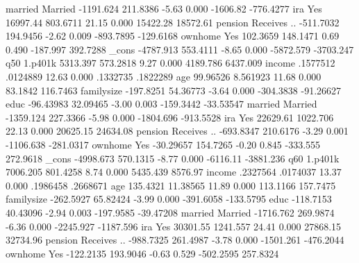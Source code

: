      married {\VBAR}
    Married  {\VBAR}  -1191.624   211.8386    -5.63   0.000     -1606.82   -776.4277
             {\VBAR}
         ira {\VBAR}
        Yes  {\VBAR}   16997.44   803.6711    21.15   0.000     15422.28    18572.61
             {\VBAR}
     pension {\VBAR}
Receives ..  {\VBAR}  -511.7032   194.9456    -2.62   0.009    -893.7895   -129.6168
             {\VBAR}
     ownhome {\VBAR}
        Yes  {\VBAR}   102.3659   148.1471     0.69   0.490     -187.997    392.7288
       _cons {\VBAR}  -4787.913   553.4111    -8.65   0.000    -5872.579   -3703.247
q50          {\VBAR}
     1.p401k {\VBAR}   5313.397   573.2818     9.27   0.000     4189.786    6437.009
      income {\VBAR}   .1577512   .0124889    12.63   0.000     .1332735    .1822289
         age {\VBAR}   99.96526   8.561923    11.68   0.000      83.1842    116.7463
  familysize {\VBAR}  -197.8251   54.36773    -3.64   0.000    -304.3838   -91.26627
        educ {\VBAR}  -96.43983   32.09465    -3.00   0.003    -159.3442   -33.53547
             {\VBAR}
     married {\VBAR}
    Married  {\VBAR}  -1359.124   227.3366    -5.98   0.000    -1804.696   -913.5528
             {\VBAR}
         ira {\VBAR}
        Yes  {\VBAR}   22629.61   1022.706    22.13   0.000     20625.15    24634.08
             {\VBAR}
     pension {\VBAR}
Receives ..  {\VBAR}  -693.8347   210.6176    -3.29   0.001    -1106.638   -281.0317
             {\VBAR}
     ownhome {\VBAR}
        Yes  {\VBAR}  -30.29657   154.7265    -0.20   0.845     -333.555    272.9618
       _cons {\VBAR}  -4998.673   570.1315    -8.77   0.000     -6116.11   -3881.236
q60          {\VBAR}
     1.p401k {\VBAR}   7006.205   801.4258     8.74   0.000     5435.439     8576.97
      income {\VBAR}   .2327564   .0174037    13.37   0.000     .1986458    .2668671
         age {\VBAR}   135.4321   11.38565    11.89   0.000     113.1166    157.7475
  familysize {\VBAR}  -262.5927   65.82424    -3.99   0.000    -391.6058   -133.5795
        educ {\VBAR}  -118.7153   40.43096    -2.94   0.003    -197.9585   -39.47208
             {\VBAR}
     married {\VBAR}
    Married  {\VBAR}  -1716.762   269.9874    -6.36   0.000    -2245.927   -1187.596
             {\VBAR}
         ira {\VBAR}
        Yes  {\VBAR}   30301.55   1241.557    24.41   0.000     27868.15    32734.96
             {\VBAR}
     pension {\VBAR}
Receives ..  {\VBAR}  -988.7325   261.4987    -3.78   0.000    -1501.261   -476.2044
             {\VBAR}
     ownhome {\VBAR}
        Yes  {\VBAR}  -122.2135   193.9046    -0.63   0.529    -502.2595    257.8324

